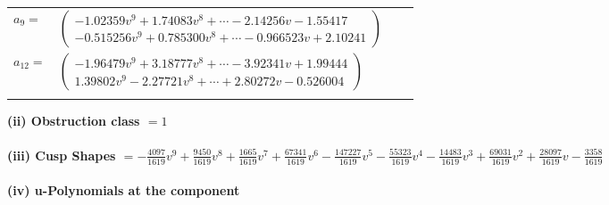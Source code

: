 \documentclass[1p]{elsarticle_modified}
\theoremstyle{definition}
\begin{document}
\begin{tabular}{m{7pt} m{180pt} m{7pt} m{180pt} }
\flushright $a_{9}=$&$\begin{pmatrix}-1.02359 v^{9}+1.74083 v^{8}+\cdots-2.14256 v-1.55417\\-0.515256 v^{9}+0.785300 v^{8}+\cdots-0.966523 v+2.10241\end{pmatrix}$ \\
\flushright $a_{12}=$&$\begin{pmatrix}-1.96479 v^{9}+3.18777 v^{8}+\cdots-3.92341 v+1.99444\\1.39802 v^{9}-2.27721 v^{8}+\cdots+2.80272 v-0.526004\end{pmatrix}$\\&\end{tabular}
\flushleft \textbf{(ii) Obstruction class $= 1$}\\~\\
\flushleft \textbf{(iii) Cusp Shapes $= -\frac{4097}{1619} v^9+\frac{9450}{1619} v^8+\frac{1665}{1619} v^7+\frac{67341}{1619} v^6-\frac{147227}{1619} v^5-\frac{55323}{1619} v^4-\frac{14483}{1619} v^3+\frac{69031}{1619} v^2+\frac{28097}{1619} v-\frac{3358}{1619}$}\\~\\
\newpage\renewcommand{\arraystretch}{1}
\flushleft \textbf{(iv) u-Polynomials at the component}\newline \\
\end{document}
